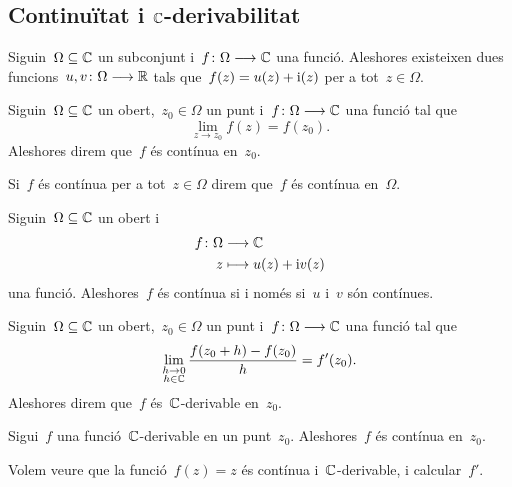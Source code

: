 \documentclass[../Apunts.tex]{subfiles}
\begin{document}
	\subsection{Continuïtat i \ensuremath{\CC}-derivabilitat}
	\begin{observation}
		Siguin~\(\Omega\subseteq\mathbb{C}\) un subconjunt
		i~\(f\colon\Omega\longrightarrow\mathbb{C}\) una funció.
		Aleshores existeixen dues funcions~\(u,v\colon\Omega\longrightarrow\mathbb{R}\)
		tals que~\(f(z)=u(z)+\mathrm{i}(z)\) per a tot~\(z\in\Omega\).
	\end{observation}
	\begin{definition}[Continuïtat]
		\label{def:funció complexa contínua}
		Siguin~\(\Omega\subseteq\mathbb{C}\) un obert,~\(z_{0}\in\Omega\) un punt
		i~\(f\colon\Omega\longrightarrow\mathbb{C}\) una funció tal que
		\[\lim_{z\to z_{0}}f(z)=f(z_{0}).\]
		Aleshores direm que~\(f\) és contínua en~\(z_{0}\).
		
		Si~\(f\) és contínua per a tot~\(z\in\Omega\) direm que~\(f\) és
		contínua en~\(\Omega\).
	\end{definition}
	\begin{observation}
		\label{obs:una funció complexa és contínua si i només si %
		ho són les seves components}
		Siguin~\(\Omega\subseteq\mathbb{C}\) un obert i
		\begin{align*}
			f\colon\Omega&\longrightarrow\mathbb{C} \\
			z&\longmapsto u(z)+\mathrm{i} v(z)
		\end{align*}
		una funció.
		Aleshores~\(f\) és contínua si i només si~\(u\) i~\(v\) són contínues.
	\end{observation}
	\begin{definition}
		\label{def:C-derivable}\label{def:funció C-derivable}
		Siguin~\(\Omega\subseteq\mathbb{C}\) un obert,~\(z_{0}\in\Omega\) un punt
		i~\(f\colon\Omega\longrightarrow\mathbb{C}\) una funció tal que
		\[
			\lim_{\substack{h\to0\\ h\in\mathbb{C}}}\frac{f(z_{0}+h)-f(z_{0})}{h}
			=f'(z_{0}).
		\]
		Aleshores direm que~\(f\) és~\(\mathbb{C}\)-derivable en~\(z_{0}\).
	\end{definition}
	\begin{observation}
		\label{obs:C-derivable implica contínua}
		Sigui~\(f\) una funció~\(\mathbb{C}\)-derivable en un punt~\(z_{0}\).
		Aleshores~\(f\) és contínua en~\(z_{0}\).
	\end{observation}
	\begin{example}
		\label{ex:la funció identitat és entera}
		Volem veure que la funció~\(f(z)=z\) és contínua i~\(\mathbb{C}\)-derivable,
		i calcular~\(f'\).
	\end{example}
\end{document}
